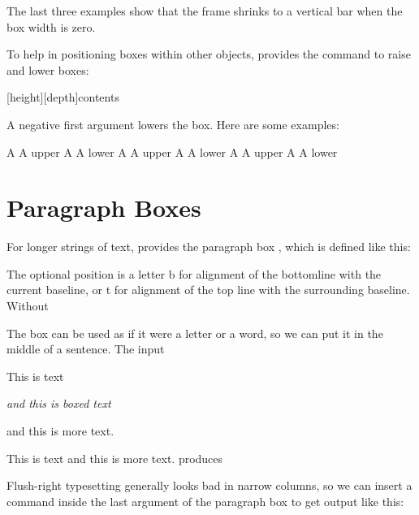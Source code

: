 {




The last three examples show that the frame shrinks to a vertical bar when
the box width is zero.

To help in positioning boxes within other objects, \latex provides the command
 to raise and lower boxes:

\begin{teX}
\raisebox{raiselength}[height][depth]{contents}
\end{teX}

A negative first argument lowers the box. Here are some examples:


A  A
upper
A  A
lower
A  A
upper
A  A
lower
A  A
upper
A  A
lower

\section{Paragraph Boxes}

For longer strings of text, \latex provides the paragraph box , which is
defined like this: 

\medskip
{} 
\medskip

The optional position
is a letter b for alignment of the bottomline with the current baseline,
or t for alignment of the top line with the surrounding baseline. Without

The box can be used as if it were a letter or a word, so we can put it in
the middle of a sentence. The input

This is text \parbox{30pt}{\it and this is boxed text} and
this is more text.

This is text 
and this is more text.
produces


Flush-right typesetting generally looks bad in narrow columns, so we
can insert a \cs{raggedright} command inside the last argument of the paragraph
box to get output like this:

\begin{texexample}{}{}


\end{texexample}}
